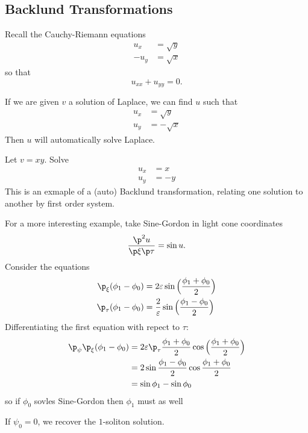 \documentclass[a4paper]{article}
\begin{document}
\subsection{Backlund Transformations}

Recall the Cauchy-Riemann equations
\begin{align*}
  u_x &= \sqrt y \\
  -u_y &= \sqrt x
\end{align*}
so that
\[
  u_{xx} + u_{yy} = 0.
\]

If we are given \(v\) a solution of Laplace, we can find \(u\) such that
\begin{align*}
  u_x &= \sqrt y \\
  u_y &= -\sqrt x
\end{align*}
Then \(u\) will automatically solve Laplace.

\begin{eg}
  Let \(v=xy\). Solve
  \begin{align*}
    u_x &= x \\
    u_y &= -y 
  \end{align*}
This is an exmaple of a (auto) Backlund transformation, relating one solution to another by first order system.
\end{eg}

For a more interesting example, take Sine-Gordon in light cone coordinates
\[
  \frac{\p^2 u}{\p\xi \p\tau} = \sin u.
\]
Consider the equations
\begin{align*}
  \p_\xi(\phi_1-\phi_0) &= 2\varepsilon \sin \Big( \frac{\phi_1+\phi_0}{2} \Big) \\
  \p_\tau(\phi_1-\phi_0) &= \frac{2}{\varepsilon} \sin \Big( \frac{\phi_1-\phi_0}{2} \Big)
\end{align*}
Differentiating the first equation with repect to \(\tau\):
\begin{align*}
  \p_\psi\p_\xi(\phi_1-\phi_0) &= 2\varepsilon \p_\tau \frac{\phi_1+\phi_0}{2}\cos \Big( \frac{\phi_1+\phi_0}{2} \Big) \\
                               &= 2\sin\frac{\phi_1-\phi_0}{2} \cos\frac{\phi_1+\phi_0}{2} \\
                               &= \sin\phi_1 - \sin\phi_0
\end{align*}
so if \(\phi_0\) sovles Sine-Gordon then \(\phi_1\) must as well

\begin{ex}
  If \(\psi_0 = 0\), we recover the \(1\)-soliton solution.
\end{ex}
\end{document}
